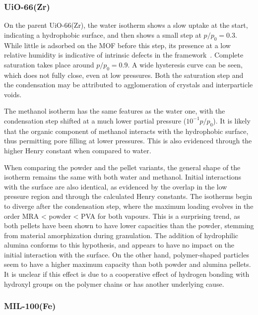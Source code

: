 \subsubsection{UiO-66(Zr)}

On the parent UiO-66(Zr), the water isotherm shows a slow uptake 
at the start, indicating a hydrophobic surface, and then shows 
a small step at \(p/p_0 = 0.3\). While little is 
adsorbed on the \gls{MOF} before this step, its presence 
at a low relative humidity is indicative of intrinsic defects
in the framework~\cite{ghoshWaterAdsorptionUiO662014}.
Complete saturation takes place around \(p/p_0 = 0.9\). 
A wide hysteresis curve can be seen, which 
does not fully close, even at low pressures. Both the
saturation step and the condensation may be attributed 
to agglomeration of crystals and interparticle voids.

The methanol isotherm has the same features as the water
one, with the condensation step shifted at a much lower 
partial pressure (\(10^{-1} p/p_0\)). It is likely that
the organic component of methanol interacts with the
hydrophobic surface, thus permitting pore filling at
lower pressures. This is also evidenced through the higher
Henry constant when compared to water.

When comparing the powder and the pellet variants, the 
general shape of the isotherm remains the same with both
water and methanol. Initial interactions with the surface are also
identical, as evidenced by the overlap in the low pressure region
and through the calculated Henry constants. The isotherms 
begin to diverge after the condensation step, where the 
maximum loading evolves in the order \gls{MRA} < powder < \gls{PVA}
for both vapours. This is a surprising trend, as both pellets
have been shown to have lower capacities than the powder,
stemming from material amorphization during granulation.
The addition of hydrophilic alumina conforms to this hypothesis,
and appears to have no impact on the initial interaction with 
the surface. On the other hand, polymer-shaped particles
seem to have a higher maximum capacity than both powder and 
alumina pellets. It is unclear if this effect is due to a 
cooperative effect of hydrogen bonding with hydroxyl groups 
on the polymer chains or has another underlying cause.


\subsubsection{MIL-100(Fe)}

